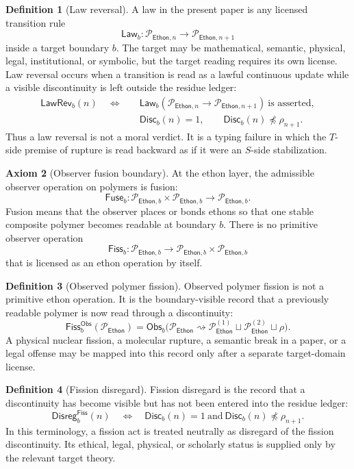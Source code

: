 \documentclass[11pt]{article}
\theoremstyle{definition}
\newtheorem{definition}{Definition}[section]
\newtheorem{axiom}[definition]{Axiom}
\theoremstyle{plain}
\newcommand{\Eth}{\mathsf{Ethon}}
\newcommand{\Obs}{\mathsf{Obs}}
\newcommand{\Fuse}{\mathsf{Fuse}}
\newcommand{\Fiss}{\mathsf{Fiss}}
\newcommand{\Law}{\mathsf{Law}}
\newcommand{\LawRev}{\mathsf{LawRev}}
\newcommand{\Disc}{\mathsf{Disc}}
\newcommand{\Disreg}{\mathsf{Disreg}}
\begin{document}
\begin{definition}[Law reversal]
A law in the present paper is any licensed transition rule
\[
  \Law_b:
  \mathcal P_{\Eth,n}
  \longrightarrow
  \mathcal P_{\Eth,n+1}
\]
inside a target boundary \(b\).  The target may be mathematical,
semantic, physical, legal, institutional, or symbolic, but the target
reading requires its own license.  Law reversal occurs when a transition
is read as a lawful continuous update while a visible discontinuity is
left outside the residue ledger:
\[
  \begin{aligned}
  \LawRev_b(n)
  \quad\Longleftrightarrow\quad
  &\Law_b(\mathcal P_{\Eth,n}\to\mathcal P_{\Eth,n+1})
    \ \text{is asserted},\\
  &\Disc_b(n)=1,\qquad
    \Disc_b(n)\not\preceq\rho_{n+1}.
  \end{aligned}
\]
Thus a law reversal is not a moral verdict.  It is a typing failure in
which the \(T\)-side premise of rupture is read backward as if it were an
\(S\)-side stabilization.
\end{definition}

\begin{axiom}[Observer fusion boundary]
At the ethon layer, the admissible observer operation on polymers is
fusion:
\[
  \Fuse_b:
  \mathcal P_{\Eth,b}\times\mathcal P_{\Eth,b}
  \longrightarrow
  \mathcal P_{\Eth,b}.
\]
Fusion means that the observer places or bonds ethons so that one stable
composite polymer becomes readable at boundary \(b\).  There is no
primitive observer operation
\[
  \Fiss_b:
  \mathcal P_{\Eth,b}
  \longrightarrow
  \mathcal P_{\Eth,b}\times\mathcal P_{\Eth,b}
\]
that is licensed as an ethon operation by itself.
\end{axiom}

\begin{definition}[Observed polymer fission]
Observed polymer fission is not a primitive ethon operation.  It is the
boundary-visible record that a previously readable polymer is now read
through a discontinuity:
\[
  \Fiss_b^{\Obs}(\mathcal P_{\Eth})
  =
  \Obs_b\bigl(
  \mathcal P_{\Eth}
  \rightsquigarrow
  \mathcal P_{\Eth}^{(1)}\sqcup\mathcal P_{\Eth}^{(2)}
  \sqcup\rho
  \bigr).
\]
A physical nuclear fission, a molecular rupture, a semantic break in a
paper, or a legal offense may be mapped into this record only after a
separate target-domain license.
\end{definition}

\begin{definition}[Fission disregard]
Fission disregard is the record that a discontinuity has become visible
but has not been entered into the residue ledger:
\[
  \Disreg_b^{\Fiss}(n)
  \quad\Longleftrightarrow\quad
  \Disc_b(n)=1
  \ \text{and}\
  \Disc_b(n)\not\preceq\rho_{n+1}.
\]
In this terminology, a fission act is treated neutrally as disregard of
the fission discontinuity.  Its ethical, legal, physical, or scholarly
status is supplied only by the relevant target theory.
\end{definition}
\end{document}
